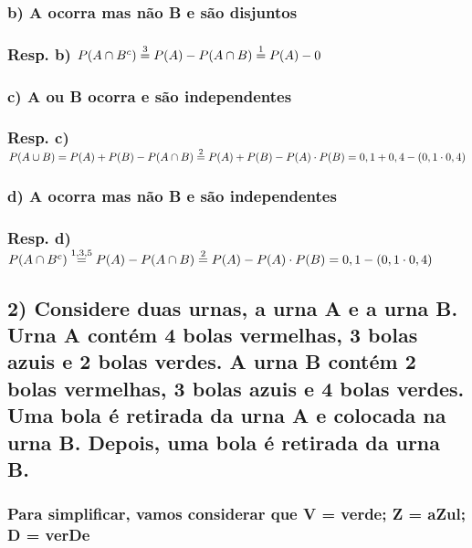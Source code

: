 \documentclass[portuguese]{article}
\begin{document}
\subsubsection*{\textmd{b) A ocorra mas não B e são disjuntos}}


\subsubsection*{\textmd{Resp. b) $P(A\cap B^{c})\protect\overset{3}{=}P(A)-P(A\cap B)\protect\overset{1}{=}P(A)-0$}}


\subsubsection*{\textmd{c) A ou B ocorra e são independentes}}


\subsubsection*{\textmd{Resp. c)$P(A\cup B)\protect\overset{}{=}P(A)+P(B)-P(A\cap B)\protect\overset{2}{=}P(A)+P(B)-P(A)\cdot P(B)=0,1+0,4-(0,1\cdot0,4)$}}


\subsubsection*{\textmd{d) A ocorra mas não B e são independentes}}


\subsubsection*{\textmd{Resp. d) $P(A\cap B^{c})\protect\overset{1,3,5}{=}P(A)-P(A\cap B)\protect\overset{2}{=}P(A)-P(A)\cdot P(B)=0,1-(0,1\cdot0,4)$}}

\textbf{\textcompwordmark{}}


\subsection*{\textmd{2) Considere duas urnas, a urna A e a urna B. Urna A contém
4 bolas vermelhas, 3 bolas azuis e 2 bolas verdes. A urna B contém
2 bolas vermelhas, 3 bolas azuis e 4 bolas verdes. Uma bola é retirada
da urna A e colocada na urna B. Depois, uma bola é retirada da urna
B.}}


\subsubsection*{\textmd{Para simplificar, vamos considerar que V = verde; Z = aZul;
D = verDe}}
\end{document}

